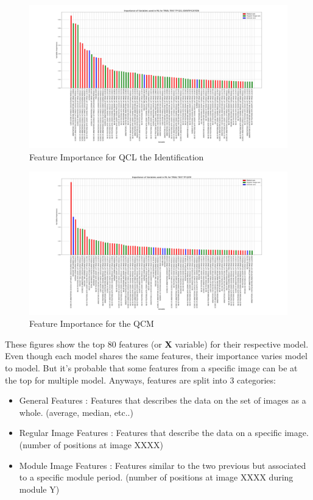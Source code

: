 \documentclass[a4paper,11pt]{report}
\numberwithin{figure}{section} %
\begin{document}
      \begin{figure}[H]
      \centering
      \includegraphics[width=.95\linewidth]{var_importance_TRIAL_TEST_TP_QCL_IDENTIFICATION_2018-04-29_14_28_02.png}
      \caption{Feature Importance for QCL the Identification}
      \label{fig:var_white2}
      \end{figure}
      
      \begin{figure}[H]
      \centering
      \includegraphics[width=.95\linewidth]{var_importance_TRIAL_TEST_TP_QCM_2018-04-29_14_34_16.png}
      \caption{Feature Importance for the QCM}
      \label{fig:var_white3}
      \end{figure}
    
    These figures show the top 80 features (or \textbf{X} variable) for their respective model. Even though each model shares the same features, their importance varies model to model. But it's probable that some features from a specific image can be at the top for multiple model. Anyways, features are split into 3 categories:
    \begin{itemize}
    \item[\textbullet] General Features : Features that describes the data on the set of images as a whole. (average, median, etc..)
    \item[\textbullet] Regular Image Features : Features that describe the data on a specific image. (number of positions at image XXXX)
    \item[\textbullet] Module Image Features : Features similar to the two previous but associated to a specific module period. (number of positions at image XXXX during module Y)
    \end{itemize}
    
\end{document}
